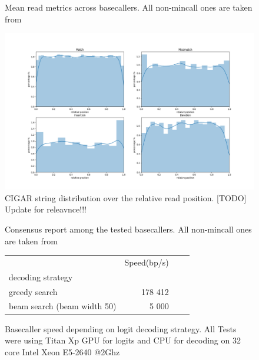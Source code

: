 \documentclass[times, utf8, diplomski, english]{fer}
\begin{document}
\begin{figure}
\label{fg:tbp:all_metrics}

\caption{Mean read metrics across basecallers. All non-mincall ones are taken from~\cite{rwick_basecalling_cmp}}
\end{figure}

\begin{figure}
    \label{fg:error_distribution}
    \begin{center}
        \includegraphics[width=\textwidth]{alignment_b0_position_report.png}
        \caption{CIGAR string distribution over the relative read position. [TODO] Update for releavnce!!!}
    \end{center}
\end{figure}

\begin{figure}
\label{fg:concensus_report}

\caption{Consensus report among the tested basecallers. All non-mincall ones are taken from~\cite{rwick_basecalling_cmp}}
\end{figure}

\begin{figure}
\label{fg:basecaller_speed}
\begin{tabular}{lrrr}
\toprule
{}                          &    Speed(bp/s) \\
decoding strategy           &                \\
\midrule
greedy search               &  178 412   \\
beam search (beam width 50) &  5 000     \\
\bottomrule
\end{tabular}
\caption{Basecaller speed depending on logit decoding strategy. All Tests were using Titan Xp GPU for logits and CPU for decoding on 32 core Intel Xeon E5-2640 @2Ghz}
\end{figure}
\end{document}
